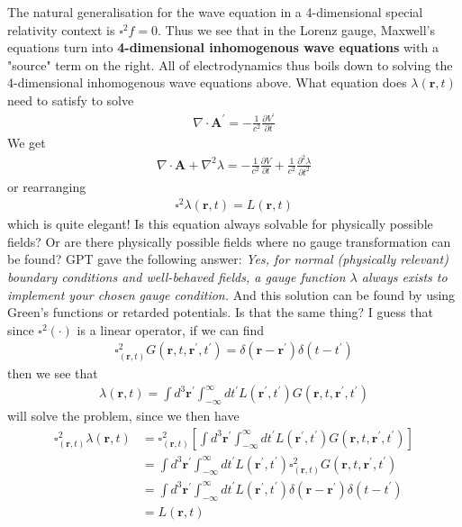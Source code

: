 The natural generalisation for the wave equation in a 4-dimensional special relativity context is \(\square^{2} f = 0\). Thus we see that in the Lorenz gauge, Maxwell's equations turn into \textbf{4-dimensional inhomogenous wave equations} with a "source" term on the right. All of electrodynamics thus boils down to solving the 4-dimensional inhomogenous wave equations above. What equation does \(\lambda (\mathbf{r}, t)\) need to satisfy to solve \begin{align*}
    \nabla \cdot \mathbf{A}^{\prime}  = - \frac{1}{c^{2} }\frac{\partial V^{\prime} }{\partial t} 
\end{align*}
We get \begin{align*}
    \nabla \cdot \mathbf{A} + \nabla ^{2} \lambda = -\frac{1}{c^{2} }\frac{\partial V}{\partial t} + \frac{1}{c^{2} }\frac{\partial^{2}  \lambda }{\partial t^{2} } 
\end{align*}
or rearranging \begin{align*}
    \square ^{2} \lambda(\mathbf{r}, t) = L(\mathbf{r}, t)
\end{align*}
which is quite elegant! Is this equation always solvable for physically possible fields? Or are there physically possible fields where no gauge transformation can be found? GPT gave the following answer: \textit{Yes, for normal (physically relevant) boundary conditions and well-behaved fields, a gauge function \(\lambda\) always exists to implement your chosen gauge condition.} And this solution can be found by using Green's functions or retarded potentials. Is that the same thing? I guess that since \(\square^{2} (\cdot )\) is a linear operator, if we can find \begin{align*}
    \square_{(\mathbf{r}, t)}^{2} G(\mathbf{r}, t, \mathbf{r}^{\prime}, t^{\prime} ) = \delta (\mathbf{r} - \mathbf{r}^{\prime} )\delta (t - t^{\prime} )
\end{align*}
then we see that \begin{align*}
    \lambda (\mathbf{r}, t) = \int d^3 \mathbf{r}^{\prime}  \int_{-\infty}^{\infty} dt^{\prime} L(\mathbf{r}^{\prime} , t^{\prime} ) G(\mathbf{r}, t, \mathbf{r}^{\prime}, t^{\prime} )  
\end{align*}
will solve the problem, since we then have\begin{align*}
    \square_{(\mathbf{r}, t)}^{2} \lambda (\mathbf{r}, t) &= \square_{(\mathbf{r}, t)}^{2} \left[ \int d^3 \mathbf{r}^{\prime}  \int_{-\infty}^{\infty} dt^{\prime} L(\mathbf{r}^{\prime} , t^{\prime} ) G(\mathbf{r}, t, \mathbf{r}^{\prime}, t^{\prime} )   \right] \\
    &= \int d^3 \mathbf{r}^{\prime}  \int_{-\infty}^{\infty} dt^{\prime} L(\mathbf{r}^{\prime} , t^{\prime} ) \square_{(\mathbf{r}, t)}^{2} G(\mathbf{r}, t, \mathbf{r}^{\prime}, t^{\prime} ) \\
    &= \int d^3 \mathbf{r}^{\prime}  \int_{-\infty}^{\infty} dt^{\prime} L(\mathbf{r}^{\prime} , t^{\prime} ) \delta (\mathbf{r} - \mathbf{r}^{\prime} )\delta (t - t^{\prime} )\\
    &= L(\mathbf{r}, t)
\end{align*}
